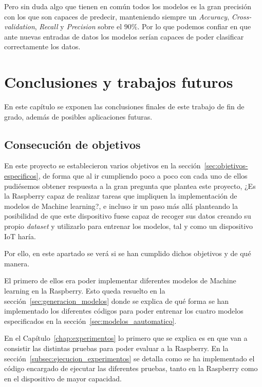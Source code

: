 \documentclass[a4paper, 12pt]{book}
\begin{document}
Pero sin duda algo que tienen en común todos los modelos es la gran precisión con los que son capaces de predecir, manteniendo siempre un \textit{Accuracy}, \textit{Cross-validation}, \textit{Recall} y \textit{Precision} sobre el $90\%$. Por lo que podemos confiar en que ante nuevas entradas de datos los modelos serían capaces de poder clasificar correctamente los datos.
 
\cleardoublepage



\chapter{Conclusiones y trabajos futuros}
\label{chap:conclusiones}

En este capítulo se exponen las conclusiones finales de este trabajo de fin de grado, además de posibles aplicaciones futuras.

\section{Consecución de objetivos}
\label{sec:consecucion-objetivos}

En este proyecto se establecieron varios objetivos en la sección~\ref{sec:objetivos-especificos}, de forma que al ir cumpliendo poco a poco con cada uno de ellos pudiésemos obtener respuesta a la gran pregunta que plantea este proyecto, ¿Es la Raspberry capaz de realizar tareas que impliquen la implementación de modelos de Machine learning?, e incluso ir un paso más allá planteando la posibilidad de que este dispositivo fuese capaz de recoger sus datos creando su propio \textit{dataset} y utilizarlo para entrenar los modelos, tal y como un dispositivo IoT haría.

Por ello, en este apartado se verá si se han cumplido dichos objetivos y de qué manera.

El primero de ellos era poder implementar diferentes modelos de Machine learning en la Raspberry. Esto queda resuelto en la sección~\ref{sec:generacion_modelos} donde se explica de qué forma se han implementado los diferentes códigos para poder entrenar los cuatro modelos especificados en la sección~\ref{sec:modelos_aautomatico}.

En el Capítulo~\ref{chap:experimentos} lo primero que se explica es en que van a consistir las distintas pruebas para poder evaluar a la Raspberry. En la sección~\ref{subsec:ejecucion_experimentos} se detalla como se ha implementado el código encargado de ejecutar las diferentes pruebas, tanto en la Raspberry como en el dispositivo de mayor capacidad.
\end{document}
